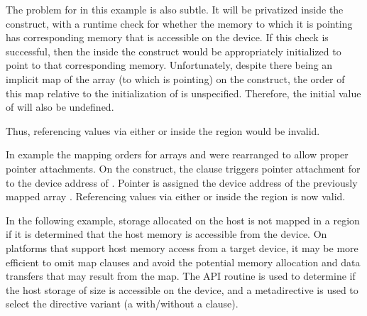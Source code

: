 The problem for  in this example is also subtle. It will be privatized
inside the  construct, with a runtime check for whether the memory
to which it is pointing has corresponding memory that is accessible on the
device. If this check is successful, then the  inside the construct
would be appropriately initialized to point to that corresponding memory.
Unfortunately, despite there being an implicit map of the array  (to
which  is pointing) on the construct, the order of this map relative to
the initialization of  is unspecified. Therefore, the initial value of
 will also be undefined.

Thus, referencing values via either  or  inside
the  region would be invalid.


In example  the mapping orders for arrays 
and  were rearranged to allow proper pointer attachments.
On the  construct, the  clause triggers pointer
attachment for  to the device address of . 
Pointer  is assigned the device address of the previously mapped
 array .
Referencing values via either  or  inside the  region is now valid.



In the following example, storage allocated on the host is not mapped in a 
region if it is determined that the host memory is accessible from the device.
On platforms that support host memory access from a target device, 
it may be more efficient to omit map clauses and avoid the potential memory allocation 
and data transfers that may result from the map.
The  API routine is used to determine if the 
host storage of size  is accessible on the device, and a metadirective
is used to select the directive variant (a  with/without a  clause).

